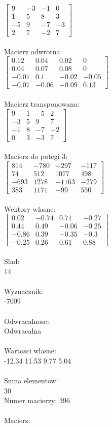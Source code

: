 \documentclass[a4paper,12pt]{article}
\begin{document}
$\begin{bmatrix} 9&-3&-1&0\\1&5&8&3\\-5&9&-7&-3\\2&7&-2&7 \end{bmatrix}$
\\
\\
Macierz odwrotna:\\

$\begin{bmatrix} 0.12&0.04&0.02&0\\0.04&0.07&0.08&0\\-0.01&0.1&-0.02&-0.05\\-0.07&-0.06&-0.09&0.13 \end{bmatrix}$
\\
\\
Macierz transponowana:\\

$\begin{bmatrix} 9&1&-5&2\\-3&5&9&7\\-1&8&-7&-2\\0&3&-3&7 \end{bmatrix}$
\\
\\
Macierz do potegi 3:\\

$\begin{bmatrix} 814&-780&-297&-117\\74&512&1077&498\\-693&1278&-1163&-279\\383&1171&-99&550 \end{bmatrix}$
\\
\\
Wektory wlasne:\\

$\begin{bmatrix} 0.02&-0.74&0.71&-0.27\\0.44&0.49&-0.06&-0.25\\-0.86&0.39&-0.35&-0.3\\-0.25&0.26&0.61&0.88 \end{bmatrix}$
\\
\\
Slad:\\
14
\\
\\
Wyznacznik:\\
-7009
\\
\\
Odwracalnosc:\\
Odwracalna
\\
\\
Wartosci wlasne:\\
-12.34 11.53 9.77 5.04
\\
\\
Suma elementow:\\
30
\\
\newpage
Numer macierzy:
396
\\
\\
Macierz:\\
\end{document}
